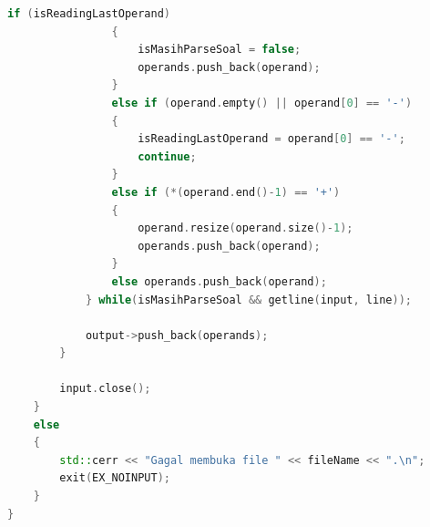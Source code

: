 \documentclass{article}
\begin{document}
\begin{lstlisting}[caption = "helpers.cpp", language = c++]
                if (isReadingLastOperand)
                {
                    isMasihParseSoal = false;
                    operands.push_back(operand);
                }
                else if (operand.empty() || operand[0] == '-')
                {
                    isReadingLastOperand = operand[0] == '-';
                    continue;
                }
                else if (*(operand.end()-1) == '+')
                {
                    operand.resize(operand.size()-1);
                    operands.push_back(operand);
                }
                else operands.push_back(operand);
            } while(isMasihParseSoal && getline(input, line));

            output->push_back(operands);
        }

        input.close();
    }
    else
    {
        std::cerr << "Gagal membuka file " << fileName << ".\n";
        exit(EX_NOINPUT);
    }
}
\end{lstlisting}
\end{document}
